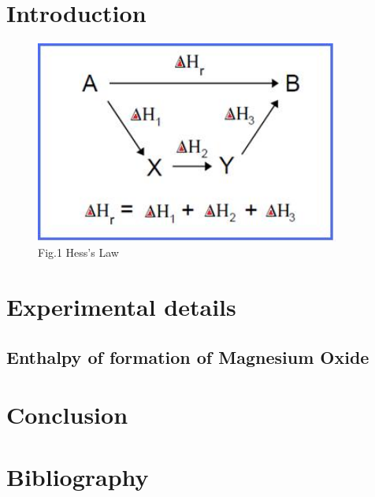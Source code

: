 \documentclass[12pt, twoside]{report}
\numberwithin{equation}{section}
\newcommand*\cleartoleftpage{%
  \clearpage
  \ifodd\value{page}\hbox{}\newpage\fi
}
\begin{document}
\chapter{Introduction}

\cleartoleftpage
\vspace*{6cm}
\begin{figure}[h]
  \begin{center}
    \includegraphics[width=10cm]{fig1}
    \end{center}
  \caption*{Fig.1 Hess's Law}
 \end{figure}
\cleardoublepage
\chapter{Experimental details}
\section{Enthalpy of formation of Magnesium Oxide}


\cleardoublepage
\chapter{Conclusion}

\cleardoublepage
\chapter{Bibliography}

\end{document}
